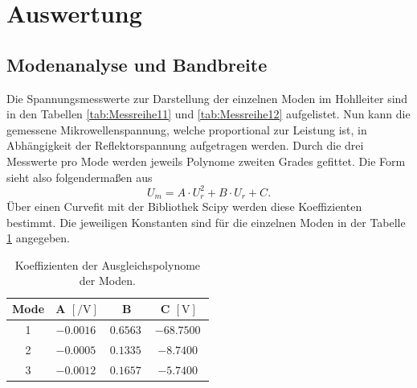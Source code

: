 \section{Auswertung}

\subsection{Modenanalyse und Bandbreite}

Die Spannungsmesswerte zur Darstellung der einzelnen Moden im Hohlleiter sind in den Tabellen \ref{tab:Messreihe11} und \ref{tab:Messreihe12} aufgelistet.
Nun kann die gemessene Mikrowellenspannung, welche proportional zur Leistung ist, in Abhängigkeit der Reflektorspannung aufgetragen werden. Durch die drei Messwerte pro Mode werden jeweils Polynome zweiten Grades gefittet.
Die Form sieht also folgendermaßen aus
\begin{equation}
U_{m} = A \cdot U_{r}^2 + B \cdot  U_{r} + C.
\end{equation}
Über einen Curvefit mit der Bibliothek Scipy \cite{scipy} werden diese Koeffizienten bestimmt.
Die jeweiligen Konstanten sind für die einzelnen Moden in der Tabelle \ref{tab:11} angegeben.

\begin{table}
    \centering
    \caption{Koeffizienten der Ausgleichspolynome der Moden.} 
    \label{tab:11}
    \begin{tabular}{c | c c c}
        \toprule
        Mode & A $[\si{\per\volt}] $ & B  & C $[\si{\volt}]$ \\
        \midrule
        1      &      $\SI{-0.0016}{}$         &       $\SI{0.6563}{}$             &        $\SI{-68.7500}{}$ \\
        2      &      $\SI{-0.0005}{}$         &       $\SI{0.1335}{}$             &        $\SI{-8.7400}{}$ \\
        3      &      $\SI{-0.0012}{}$         &       $\SI{0.1657}{}$             &        $\SI{-5.7400}{}$ \\
    \end{tabular}
\end{table}

